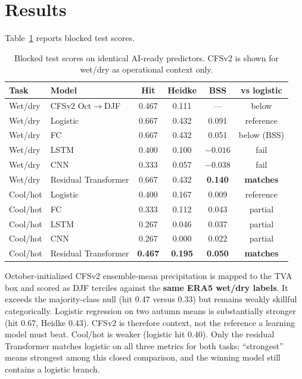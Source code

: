 \documentclass{article}
\begin{document}
\section{Results}

Table~\ref{tab:results} reports blocked test scores.

\begin{table}[t]
\caption{Blocked test scores on identical AI-ready predictors. CFSv2 is shown for wet/dry as operational context only.}
\label{tab:results}
\centering
\setlength{\tabcolsep}{3.5pt}
\begin{tabular}{@{}llcccc@{}}
\toprule
\textbf{Task} & \textbf{Model} & \textbf{Hit} & \textbf{Heidke} & \textbf{BSS} & \textbf{vs logistic} \\
\midrule
Wet/dry & CFSv2 Oct$\rightarrow$DJF & 0.467 & 0.111 & --- & below \\
Wet/dry & Logistic & 0.667 & 0.432 & 0.091 & reference \\
Wet/dry & FC & 0.667 & 0.432 & 0.051 & below (BSS) \\
Wet/dry & LSTM & 0.400 & 0.100 & $-0.016$ & fail \\
Wet/dry & CNN & 0.333 & 0.057 & $-0.038$ & fail \\
Wet/dry & Residual Transformer & 0.667 & 0.432 & \textbf{0.140} & \textbf{matches} \\
\midrule
Cool/hot & Logistic & 0.400 & 0.167 & 0.009 & reference \\
Cool/hot & FC & 0.333 & 0.112 & 0.043 & partial \\
Cool/hot & LSTM & 0.267 & 0.046 & 0.037 & partial \\
Cool/hot & CNN & 0.267 & 0.000 & 0.022 & partial \\
Cool/hot & Residual Transformer & \textbf{0.467} & \textbf{0.195} & \textbf{0.050} & \textbf{matches} \\
\bottomrule
\end{tabular}
\end{table}

October-initialized CFSv2 ensemble-mean precipitation is mapped to the TVA box and scored as DJF terciles against the \textbf{same ERA5 wet/dry labels}. It exceeds the majority-class null (hit \(0.47\) versus \(0.33\)) but remains weakly skillful categorically. Logistic regression on two autumn means is substantially stronger (hit \(0.67\), Heidke \(0.43\)). CFSv2 is therefore context, not the reference a learning model must beat. Cool/hot is weaker (logistic hit \(0.40\)). Only the residual Transformer matches logistic on all three metrics for both tasks; ``strongest'' means strongest among this closed comparison, and the winning model still contains a logistic branch.
\end{document}
